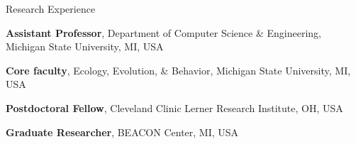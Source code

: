 \begin{rubric}{Research Experience}

\entry*[2020 - Present] \textbf{Assistant Professor}, Department of Computer Science \& Engineering, Michigan State University, MI, USA

\entry*[2020 - Present] \textbf{Core faculty}, Ecology, Evolution, \& Behavior, Michigan State University, MI, USA

\entry*[2019 - 2020] \textbf{Postdoctoral Fellow}, Cleveland Clinic Lerner Research Institute, OH, USA
\ifshort
\else

\fi
%
\entry*[2013 -- 2019] \textbf{Graduate Researcher}, BEACON Center, MI, USA
\ifshort
\else

\fi
%


%

\end{rubric}